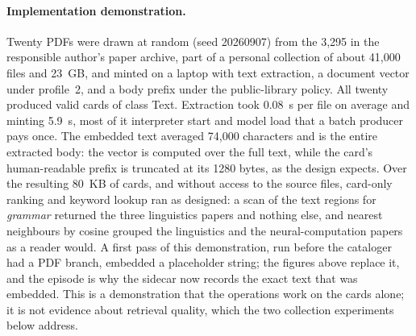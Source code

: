 \documentclass[11pt]{article}
\begin{document}
\paragraph{Implementation demonstration.} Twenty PDFs were drawn at random
(seed 20260907) from the 3,295 in the responsible author's paper archive, part
of a personal collection of about 41,000 files and 23~GB, and minted on a
laptop with text extraction, a document vector under profile~2, and a body
prefix under the public-library policy. All twenty produced valid cards of
class Text. Extraction took 0.08~s per file on average and minting 5.9~s,
most of it interpreter start and model load that a batch producer pays once.
The embedded text averaged 74,000 characters and is the entire extracted
body: the vector is computed over the full text, while the card's
human-readable prefix is truncated at its 1280 bytes, as the design expects.
Over the resulting 80~KB of cards, and without access to the source files,
card-only ranking and keyword lookup ran as designed: a scan of the text
regions for \emph{grammar} returned the three linguistics papers and nothing
else, and nearest neighbours by cosine grouped the linguistics and the
neural-computation papers as a reader would. A first pass of
this demonstration, run before the cataloger had a PDF branch, embedded a
placeholder string; the figures above replace it, and the episode is why the
sidecar now records the exact text that was embedded. This is a demonstration
that the operations work on the cards alone; it is not evidence about
retrieval quality, which the two collection experiments below address.
\end{document}
